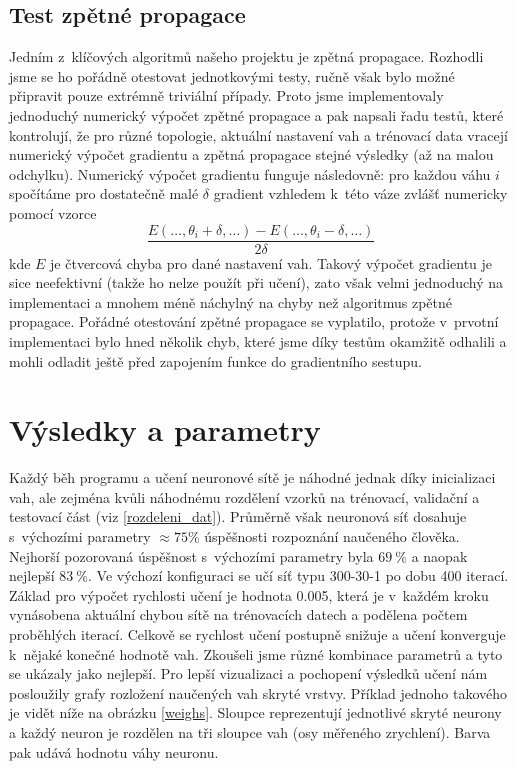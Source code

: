 \documentclass[a4paper, 10pt, twocolumn]{article}
\begin{document}
    \subsection{Test zpětné propagace}
    Jedním z~klíčových algoritmů našeho projektu je zpětná propagace.
    Rozhodli jsme se ho pořádně otestovat jednotkovými testy, ručně však bylo možné připravit pouze extrémně triviální případy.
    Proto jsme implementovaly jednoduchý numerický výpočet zpětné propagace a pak napsali řadu testů, které kontrolují, že pro různé topologie, aktuální nastavení vah a trénovací data vracejí numerický výpočet gradientu a zpětná propagace stejné výsledky (až na malou odchylku).
    Numerický výpočet gradientu funguje následovně: pro každou váhu $i$ spočítáme pro dostatečně malé $\delta$ gradient vzhledem k~této váze zvlášť numericky pomocí vzorce
    $$\frac{E(\ldots, \theta_i + \delta, \ldots) - E(\ldots, \theta_i - \delta, \ldots)}{2\delta}$$
    kde $E$ je čtvercová chyba pro dané nastavení vah.
    Takový výpočet gradientu je sice neefektivní (takže ho nelze použít při učení), zato však velmi jednoduchý na implementaci a mnohem méně náchylný na chyby než algoritmus zpětné propagace.
    Pořádné otestování zpětné propagace se vyplatilo, protože v~prvotní implementaci bylo hned několik chyb, které jsme díky testům okamžitě odhalili a mohli odladit ještě před zapojením funkce do gradientního sestupu.


\section{Výsledky a parametry}
Každý běh programu a učení neuronové sítě je náhodné jednak díky inicializaci vah, ale zejména kvůli náhodnému rozdělení vzorků na trénovací, validační a testovací část (viz \ref{rozdeleni_dat}). Průměrně však neuronová síť dosahuje s~výchozími parametry $\approx 75\% $ úspěšnosti rozpoznání naučeného člověka. Nejhorší pozorovaná úspěšnost s~výchozími parametry byla $69~\%$ a naopak nejlepší $83~\%$. Ve výchozí konfiguraci se učí síť typu 300-30-1 po dobu 400 iterací. Základ pro výpočet rychlosti učení je hodnota 0.005, která je v~každém kroku vynásobena aktuální chybou sítě na trénovacích datech a podělena počtem proběhlých iterací. Celkově se rychlost učení postupně snižuje a učení konverguje k~nějaké konečné hodnotě vah. Zkoušeli jsme různé kombinace parametrů a tyto se ukázaly jako nejlepší. Pro lepší vizualizaci a pochopení výsledků učení nám posloužily grafy rozložení naučených vah skryté vrstvy. Příklad jednoho takového je vidět níže na obrázku \ref{weighs}. Sloupce reprezentují jednotlivé skryté neurony a každý neuron je rozdělen na tři sloupce vah (osy měřeného zrychlení). Barva pak udává hodnotu váhy neuronu.  
\end{document}
